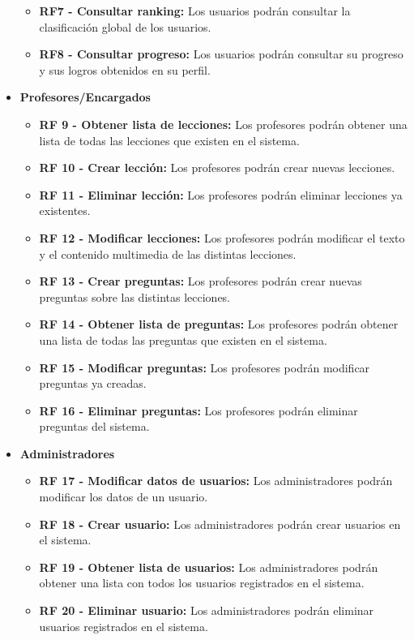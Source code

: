 \begin{itemize}
\begin{itemize}
              \item \textbf{RF7 - Consultar ranking: }Los usuarios podrán consultar la clasificación global de los usuarios.
              \item \textbf{RF8 - Consultar progreso: } Los usuarios podrán consultar su progreso y sus logros obtenidos en su perfil.
          \end{itemize}
    \item \textbf{Profesores/Encargados}
          \begin{itemize}
              \item \textbf{RF 9 - Obtener lista de lecciones: } Los profesores podrán obtener una lista de todas las lecciones que existen en el sistema.
              \item \textbf{RF 10 - Crear lección: }Los profesores podrán crear nuevas lecciones.
              \item \textbf{RF 11 - Eliminar lección: }Los profesores podrán eliminar lecciones ya existentes.
              \item \textbf{RF 12 - Modificar lecciones: }Los profesores podrán modificar el texto y el contenido multimedia de las distintas lecciones.
              \item \textbf{RF 13 - Crear preguntas: } Los profesores podrán crear nuevas preguntas sobre las distintas lecciones.
              \item \textbf{RF 14 - Obtener lista de preguntas: } Los profesores podrán obtener una lista de todas las preguntas que existen en el sistema.
              \item \textbf{RF 15 - Modificar preguntas: } Los profesores podrán modificar preguntas ya creadas.
              \item \textbf{RF 16 - Eliminar preguntas: } Los profesores podrán eliminar preguntas del sistema.
          \end{itemize}
    \item \textbf{Administradores}
          \begin{itemize}
              \item \textbf{RF 17 - Modificar datos de usuarios: }Los administradores podrán modificar los datos de un usuario.
              \item \textbf{RF 18 - Crear usuario: }Los administradores podrán crear usuarios en el sistema.
              \item \textbf{RF 19 - Obtener lista de usuarios: } Los administradores podrán obtener una lista con todos los usuarios registrados en el sistema.
              \item \textbf{RF 20 - Eliminar usuario: }Los administradores podrán eliminar usuarios registrados en el sistema.
          \end{itemize}
\end{itemize}

